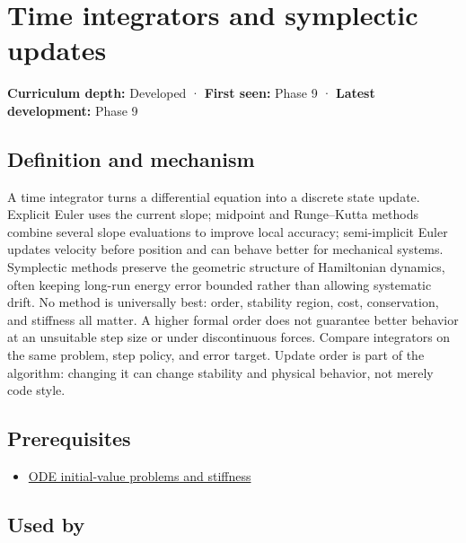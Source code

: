 \hypertarget{appendix-8f96f9c4d5bc}{}\label{referencestart:appendix-8f96f9c4d5bc}
\section{Time integrators and symplectic updates}\label{appendix-8f96f9c4d5bc-time-integrators-and-symplectic-updates}

\textbf{Curriculum depth:} Developed · \textbf{First seen:} Phase 9 · \textbf{Latest development:} Phase 9

\begin{allmightroledefinition}

\subsection{Definition and mechanism}\label{appendix-8f96f9c4d5bc-definition-and-mechanism}

A time integrator turns a differential equation into a discrete state update. Explicit Euler uses the current slope; midpoint and Runge--Kutta methods combine several slope evaluations to improve local accuracy; semi-implicit Euler updates velocity before position and can behave better for mechanical systems. Symplectic methods preserve the geometric structure of Hamiltonian dynamics, often keeping long-run energy error bounded rather than allowing systematic drift. No method is universally best: order, stability region, cost, conservation, and stiffness all matter. A higher formal order does not guarantee better behavior at an unsuitable step size or under discontinuous forces. Compare integrators on the same problem, step policy, and error target. Update order is part of the algorithm: changing it can change stability and physical behavior, not merely code style.

\end{allmightroledefinition}

\subsection{Prerequisites}\label{appendix-8f96f9c4d5bc-prerequisites}

\begin{itemize}
\tightlist
\item
  \hyperref[appendix-e8ab9836882e]{ODE initial-value problems and stiffness}
\end{itemize}

\subsection{Used by}\label{appendix-8f96f9c4d5bc-used-by}

